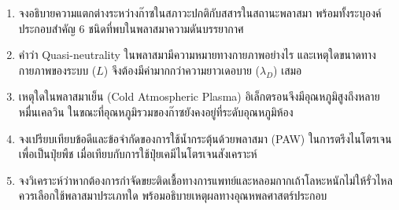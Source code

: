 \begin{enumerate}
    \item จงอธิบายความแตกต่างระหว่างก๊าซในสภาวะปกติกับสสารในสถานะพลาสมา พร้อมทั้งระบุองค์ประกอบสำคัญ 6 ชนิดที่พบในพลาสมาความดันบรรยากาศ
    \item คำว่า Quasi-neutrality ในพลาสมามีความหมายทางกายภาพอย่างไร และเหตุใดขนาดทางกายภาพของระบบ ($L$) จึงต้องมีค่ามากกว่าความยาวเดอบาย ($\lambda_D$) เสมอ
    \item เหตุใดในพลาสมาเย็น (Cold Atmospheric Plasma) อิเล็กตรอนจึงมีอุณหภูมิสูงถึงหลายหมื่นเคลวิน ในขณะที่อุณหภูมิรวมของก๊าซยังคงอยู่ที่ระดับอุณหภูมิห้อง
    \item จงเปรียบเทียบข้อดีและข้อจำกัดของการใช้น้ำกระตุ้นด้วยพลาสมา (PAW) ในการตรึงไนโตรเจนเพื่อเป็นปุ๋ยพืช เมื่อเทียบกับการใช้ปุ๋ยเคมีไนโตรเจนสังเคราะห์
    \item จงวิเคราะห์ว่าหากต้องการกำจัดขยะติดเชื้อทางการแพทย์และหลอมกากเถ้าโลหะหนักไม่ให้รั่วไหล ควรเลือกใช้พลาสมาประเภทใด พร้อมอธิบายเหตุผลทางอุณหพลศาสตร์ประกอบ
\end{enumerate}

\clearpage
